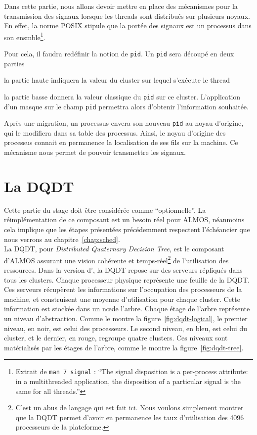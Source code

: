      Dans cette partie, nous allons devoir mettre en place des mécanismes pour
      la transmission des signaux lorsque les threads sont distribués sur
      plusieurs noyaux. En effet, la norme POSIX stipule que la portée des
      signaux est un processus dans son ensmble\footnote{Extrait de \texttt{man
          7 signal} : ``The signal disposition is a per-process attribute: in a
        multithreaded application, the disposition of a particular signal is the
        same for all threads.''}.

      Pour cela, il faudra redéfinir la notion de \texttt{pid}. Un \texttt{pid}
      sera découpé en deux parties \benumline \item la partie haute indiquera la
      valeur du cluster sur lequel s'exécute le thread \item la partie basse
      donnera la valeur classique du \texttt{pid} sur ce
      cluster\eenumline. L'application d'un masque sur le champ \texttt{pid}
      permettra alors d'obtenir l'information souhaitée.

      Après une migration, un processus envera son nouveau \texttt{pid} au noyau
      d'origine, qui le modifiera dans sa table des processus. Ainsi, le noyau
      d'origine des processus connait en permanence la localisation de ses fils
      sur la machine. Ce mécanisme nous permet de pouvoir transmettre les
      signaux.


  \section{La DQDT}
  \label{sec:dqdt}

    Cette partie du stage doit être considérée comme ``optionnelle''. La
    réimplémentation de ce composant est un besoin réel pour ALMOS, néanmoins
    cela implique que les étapes présentées précédemment respectent l'échéancier
    que nous verrons au chapitre~\ref{chap:sched}.\\

    La DQDT, pour \textit{Distributed Quaternary Decision Tree}, est le
    composant d'ALMOS assurant une vision cohérente et temps-réel\footnote{C'est
      un abus de langage qui est fait ici. Nous voulons simplement montrer que
      la DQDT permet d'avoir en permanence les taux d'utilisation des 4096
      processeurs de la plateforme.} de l'utilisation des ressources. Dans la
    version d'\citet{almaless2014universite}, la DQDT repose sur des serveurs
    répliqués dans tous les clusters. Chaque processeur physique représente une
    feuille de la DQDT. Ces serveurs récupèrent les informations sur
    l'occupation des processeurs de la machine, et construisent une moyenne
    d'utilisation pour chaque cluster. Cette information est stockée dans un
    n\oe de l'arbre. Chaque étage de l'arbre représente un niveau
    d'abstraction. Comme le montre la figure~\ref{fig:dqdt-logical}, le premier
    niveau, en noir, est celui des processeurs. Le second niveau, en bleu, est
    celui du cluster, et le dernier, en rouge, regroupe quatre clusters. Ces
    niveaux sont matérialisés par les étages de l'arbre, comme le montre la
    figure~\ref{fig:dqdt-tree}.\\

